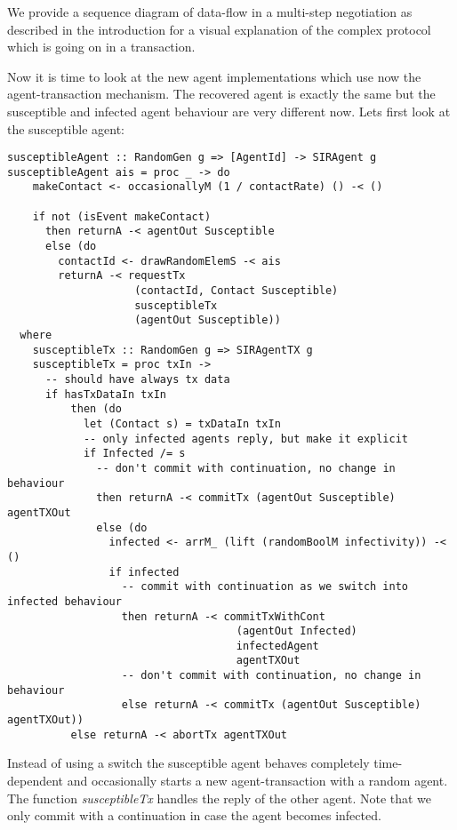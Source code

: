 We provide a sequence diagram of data-flow in a multi-step negotiation as described in the introduction for a visual explanation of the complex protocol which is going on in a transaction.

Now it is time to look at the new agent implementations which use now the agent-transaction mechanism. The recovered agent is exactly the same but the susceptible and infected agent behaviour are very different now. Lets first look at the susceptible agent:

\begin{verbatim}
susceptibleAgent :: RandomGen g => [AgentId] -> SIRAgent g
susceptibleAgent ais = proc _ -> do
    makeContact <- occasionallyM (1 / contactRate) () -< ()

    if not (isEvent makeContact)
      then returnA -< agentOut Susceptible
      else (do
        contactId <- drawRandomElemS -< ais
        returnA -< requestTx 
                    (contactId, Contact Susceptible) 
                    susceptibleTx
                    (agentOut Susceptible))
  where
    susceptibleTx :: RandomGen g => SIRAgentTX g
    susceptibleTx = proc txIn ->
      -- should have always tx data
      if hasTxDataIn txIn 
          then (do
            let (Contact s) = txDataIn txIn 
            -- only infected agents reply, but make it explicit
            if Infected /= s
              -- don't commit with continuation, no change in behaviour
              then returnA -< commitTx (agentOut Susceptible) agentTXOut
              else (do
                infected <- arrM_ (lift (randomBoolM infectivity)) -< ()
                if infected
                  -- commit with continuation as we switch into infected behaviour
                  then returnA -< commitTxWithCont 
                                    (agentOut Infected) 
                                    infectedAgent
                                    agentTXOut
                  -- don't commit with continuation, no change in behaviour
                  else returnA -< commitTx (agentOut Susceptible) agentTXOut))
          else returnA -< abortTx agentTXOut
\end{verbatim}

Instead of using a switch the susceptible agent behaves completely time-dependent and occasionally starts a new agent-transaction with a random agent. The function \textit{susceptibleTx} handles the reply of the other agent. Note that we only commit with a continuation in case the agent becomes infected.

